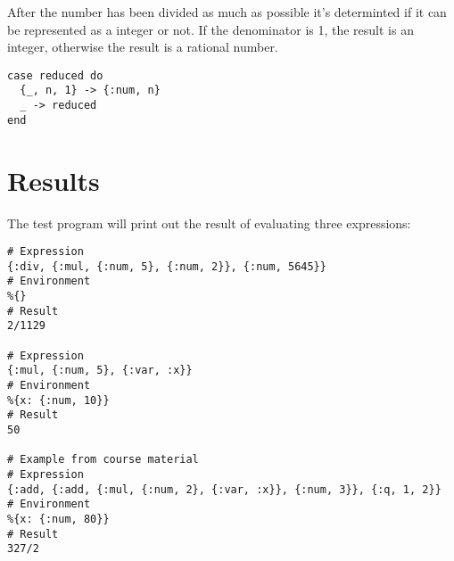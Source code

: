 \documentclass[a4paper,11pt]{article}
\begin{document}
After the number has been divided as much as possible it's determinted if it can be represented as a integer or not.
If the denominator is 1, the result is an integer, otherwise the result is a rational number.

\begin{verbatim}
case reduced do
  {_, n, 1} -> {:num, n}
  _ -> reduced
end
\end{verbatim}

\section*{Results}

The test program will print out the result of evaluating three expressions:

\begin{verbatim}
# Expression
{:div, {:mul, {:num, 5}, {:num, 2}}, {:num, 5645}}
# Environment
%{}
# Result
2/1129

# Expression
{:mul, {:num, 5}, {:var, :x}}
# Environment
%{x: {:num, 10}}
# Result
50

# Example from course material
# Expression
{:add, {:add, {:mul, {:num, 2}, {:var, :x}}, {:num, 3}}, {:q, 1, 2}}
# Environment
%{x: {:num, 80}}
# Result
327/2
\end{verbatim}
\end{document}
